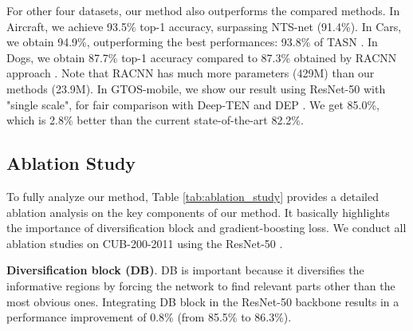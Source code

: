 \documentclass[letterpaper]{article} \usepackage{aaai20}  \usepackage{times}  \usepackage{helvet} \usepackage{courier}  \usepackage[hyphens]{url}  \usepackage{graphicx} \usepackage{multirow}
\begin{document}
For other four datasets, our method also outperforms the compared methods. In Aircraft, we achieve 93.5\% top-1 accuracy, surpassing NTS-net \cite{nts_2018} (91.4\%). In Cars, we obtain 94.9\%, outperforming the best performances: 93.8\% of TASN \cite{zheng2019looking}. In Dogs, we obtain 87.7\% top-1 accuracy compared to 87.3\% obtained by RACNN approach \cite{racnn_2017}. Note that RACNN has much more parameters (429M) than our methods (23.9M). In GTOS-mobile, we show our result using ResNet-50 with "single scale", for fair comparison with  Deep-TEN \cite{zhang2017deep} and DEP \cite{dataset_gtosmobile}. We get 85.0\%, which is 2.8\% better than the current state-of-the-art 82.2\%.

\begin{table}[h]
\centering
{}
\caption{Experimental results on GTOS-mobile.}
\label{tab:gtos}
\end{table}

\subsection{Ablation Study}
To fully analyze our method, Table \ref{tab:ablation_study} provides a detailed ablation analysis on the key components of our method. It basically highlights the importance of diversification block and gradient-boosting loss. We conduct all ablation studies on CUB-200-2011 using the ResNet-50 \cite{resnet_2016}.

\textbf{Diversification block (DB)}. DB is important because it diversifies the informative regions by forcing the network to find relevant parts other than the most obvious ones. Integrating DB block in the ResNet-50 backbone results in a performance improvement of 0.8\%  (from 85.5\% to 86.3\%). 
\end{document}
